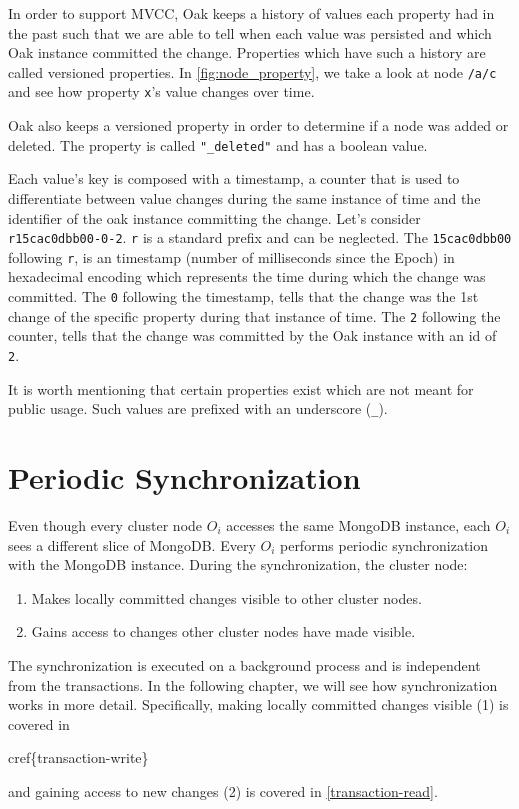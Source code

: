 \documentclass[abstracton,12pt]{scrreprt}
\begin{document}
In order to support MVCC, Oak keeps a history of values each property had in the past such that we are able to tell when each value was persisted and which Oak instance committed the change. 
Properties which have such a history are called versioned properties.
In \cref{fig:node_property}, we take a look at node \texttt{/a/c} and see how property \texttt{x}'s value changes over time.

Oak also keeps a versioned property in order to determine if a node was added or deleted.
The property is called \texttt{"\_deleted"} and has a boolean value.

Each value's key is composed with a timestamp, a counter that is used to differentiate between value changes during the same instance of time and the identifier of the oak instance committing the change.
Let's consider \texttt{r15cac0dbb00-0-2}.
\texttt{r} is a standard prefix and can be neglected.
The \texttt{15cac0dbb00} following \texttt{r}, is an timestamp (number of milliseconds since the Epoch) in hexadecimal encoding which represents the time during which the change was committed.
The \texttt{0} following the timestamp, tells that the change was the 1st change of the specific property during that instance of time.
The \texttt{2} following the counter, tells that the change was committed by the Oak instance with an id of \texttt{2}.

It is worth mentioning that certain properties exist which are not meant for public usage.
Such values are prefixed with an underscore (\texttt{\_}).

\section{Periodic Synchronization}

Even though every cluster node $O_i$ accesses the same MongoDB instance,
each $O_i$ sees a different slice of MongoDB.
Every $O_i$ performs periodic synchronization with the MongoDB instance.
During the synchronization, the cluster node:
\begin{enumerate}
    \item Makes locally committed changes visible to other cluster nodes.
    \item Gains access to changes other cluster nodes have made visible.
\end{enumerate}

The synchronization is executed on a background process and is independent from the transactions.
In the following chapter, we will see how synchronization works in more detail.
Specifically, making locally committed changes visible (1) is covered in {\huge{cref\{transaction-write\}}\par} and
gaining access to new changes (2) is covered in \cref{transaction-read}.
\end{document}

